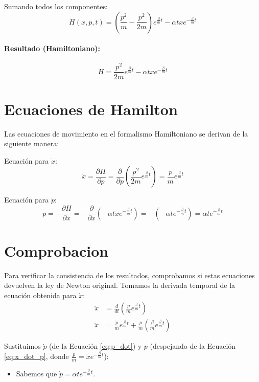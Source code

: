 \documentclass[12pt, a4paper]{article}
\begin{document}
Sumando todos los componentes:
\[
H(x, p, t) = \left( \frac{p^2}{m} - \frac{p^2}{2m} \right) e^{\frac{\beta}{m}t} - \alpha t x e^{-\frac{\beta}{m}t}
\]

\paragraph{Resultado (Hamiltoniano):}
\begin{equation}
    H = \frac{p^2}{2m} e^{\frac{\beta}{m}t} - \alpha t x e^{-\frac{\beta}{m}t}
\end{equation}

\section*{Ecuaciones de Hamilton}

Las ecuaciones de movimiento en el formalismo Hamiltoniano se derivan de la siguiente manera:

Ecuación para $\dot{x}$:
\begin{equation}
    \dot{x} = \frac{\partial H}{\partial p} = \frac{\partial}{\partial p} \left( \frac{p^2}{2m} e^{\frac{\beta}{m}t} \right) = \frac{p}{m} e^{\frac{\beta}{m}t}
\end{equation}

Ecuación para $\dot{p}$:
\begin{equation}
    \dot{p} = -\frac{\partial H}{\partial x} = -\frac{\partial}{\partial x} \left( -\alpha t x e^{-\frac{\beta}{m}t} \right) = -(-\alpha t e^{-\frac{\beta}{m}t}) = \alpha t e^{-\frac{\beta}{m}t}
    \label{eq:p_dot}
\end{equation}

\section*{Comprobacion}

Para verificar la consistencia de los resultados, comprobamos si estas ecuaciones devuelven la ley de Newton original.
Tomamos la derivada temporal de la ecuación obtenida para $\dot{x}$:
\begin{align*}
    \ddot{x} &= \frac{d}{dt} \left( \frac{p}{m} e^{\frac{\beta}{m}t} \right) \\
    \ddot{x} &= \frac{\dot{p}}{m} e^{\frac{\beta}{m}t} + \frac{p}{m} \left( \frac{\beta}{m} e^{\frac{\beta}{m}t} \right)
\end{align*}

Sustituimos $\dot{p}$ (de la Ecuación \ref{eq:p_dot}) y $p$ (despejando de la Ecuación \ref{eq:x_dot_p}, donde $\frac{p}{m} = \dot{x} e^{-\frac{\beta}{m}t}$):
\begin{itemize}
    \item Sabemos que $\dot{p} = \alpha t e^{-\frac{\beta}{m}t}$.
\end{itemize}
\end{document}
